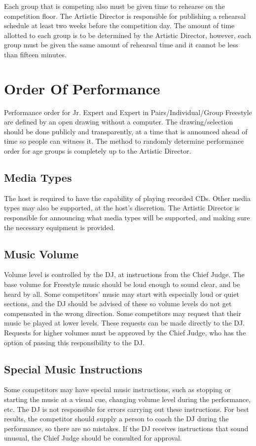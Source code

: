 Each group that is competing also must be given time to rehearse on the competition floor.
The Artistic Director is responsible for publishing a rehearsal schedule at least two weeks before the competition day.
The amount of time allotted to each group is to be determined by the Artistic Director, however, each group must be given the same amount of rehearsal time and it cannot be less than fifteen minutes.

\section{Order Of Performance}
Performance order for Jr. Expert and Expert in Pairs/Individual/Group Freestyle are defined by an open drawing without a computer. %
The drawing/selection should be done publicly and transparently, at a time that is announced ahead of time so people can witness it.
The method to randomly determine performance order for age groups is completely up to the Artistic Director.

\subsection{Media Types} %
The host is required to have the capability of playing recorded CDs.
Other media types may also be supported, at the host's discretion.
The Artistic Director is responsible for announcing what media types will be supported, and making sure the necessary equipment is provided.

\subsection{Music Volume} %
Volume level is controlled by the DJ, at instructions from the Chief Judge.
The base volume for Freestyle music should be loud enough to sound clear, and be heard by all.
Some competitors' music may start with especially loud or quiet sections, and the DJ should be advised of these so volume levels do not get compensated in the wrong direction.
Some competitors may request that their music be played at lower levels.
These requests can be made directly to the DJ.
Requests for higher volumes must be approved by the Chief Judge, who has the option of passing this responsibility to the DJ.

\subsection{Special Music Instructions}
Some competitors may have special music instructions, such as stopping or starting the music at a visual cue, changing volume level during the performance, etc.
The DJ is not responsible for errors carrying out these instructions.
For best results, the competitor should supply a person to coach the DJ during the performance, so there are no mistakes.
If the DJ receives instructions that sound unusual, the Chief Judge should be consulted for approval.

